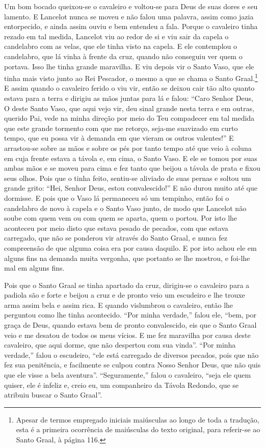 Um bom bocado queixou-se o cavaleiro e voltou-se para Deus de suas dores e seu
lamento. E Lancelot nunca se moveu e não falou uma palavra, assim como jazia
entorpecido, e ainda assim ouviu e bem entendeu a fala. Porque o cavaleiro
tinha rezado em tal medida, Lancelot viu ao redor de si e viu sair da capela o
candelabro com as velas, que ele tinha visto na capela. E ele contemplou o
candelabro, que lá vinha à frente da cruz, quando não conseguiu ver quem o
portava. Isso lhe tinha grande maravilha. E viu depois vir o Santo Vaso, que
ele tinha mais visto junto ao Rei Pescador, o mesmo a que se chama o Santo
Graal.\footnote{ Apesar de termos empregado iniciais maiúsculas ao longo de toda
a tradução, esta é a primeira ocorrência de maiúsculas do texto original, para
referir-se ao Santo Graal, à página 116.} E assim quando o
cavaleiro ferido o viu vir, então se deixou cair tão alto quanto estava para a
terra e dirigiu as mãos juntas para lá e falou: “Caro Senhor Deus, O deste
Santo Vaso, que aqui vejo vir, deu sinal grande nesta terra e em outras,
querido Pai, vede na minha direção por meio do Teu compadecer em tal medida que
este grande tormento com que me retorço, seja-me suavizado em curto tempo, que
eu possa vir à demanda em que vieram os outros valentes!” E arrastou-se sobre
as mãos e sobre os pés por tanto tempo até que veio à coluna em cuja frente
estava a távola e, em cima, o Santo Vaso. E ele se tomou por suas ambas mãos e
se moveu para cima e fez tanto que beijou a távola de prata e fixou seus olhos.
Pois que o tinha feito, sentiu-se aliviado de suas pernas e soltou um grande
grito: “Hei, Senhor Deus, estou convalescido!” E não durou muito até que
dormisse. E pois que o Vaso lá permaneceu só um tempinho, então foi o
candelabro de novo à capela e o Santo Vaso junto, de modo que Lancelot não
soube com quem vem ou com quem se aparta, quem o portou. Por isto lhe aconteceu
por meio disto que estava pesado de pecados, com que estava carregado, que não
se ponderou vir através do Santo Graal, e nunca fez compreensão de que alguma
coisa era por causa daquilo. E por isto achou ele em alguns fins na demanda
muita vergonha, que portanto se lhe mostrou, e foi-lhe mal em alguns fins. 

Pois que o Santo Graal se tinha apartado da cruz, dirigiu-se o cavaleiro para a
padiola são e forte e beijou a cruz e de pronto veio um escudeiro e lhe trouxe
arma assim bela e assim rica. E quando vislumbrou o cavaleiro, então lhe
perguntou como lhe tinha acontecido. “Por minha verdade,” falou ele, “bem, por
graça de Deus, quando estava bem de pronto convalescido, eis que o Santo Graal
veio e me desatou de todos os meus vícios. E me fez maravilha por causa deste
cavaleiro, que aqui dorme, que não despertou com sua vinda”. “Por minha
verdade,” falou o escudeiro, “ele está carregado de diversos pecados, pois que
não fez sua penitência, e facilmente se culpou contra Nosso Senhor Deus, que
não quis que ele visse a bela aventura”. “Seguramente,” falou o cavaleiro,
“seja ele quem quiser, ele é infeliz e, creio eu, um companheiro da Távola
Redondo, que se atribuiu buscar o Santo Graal”.

